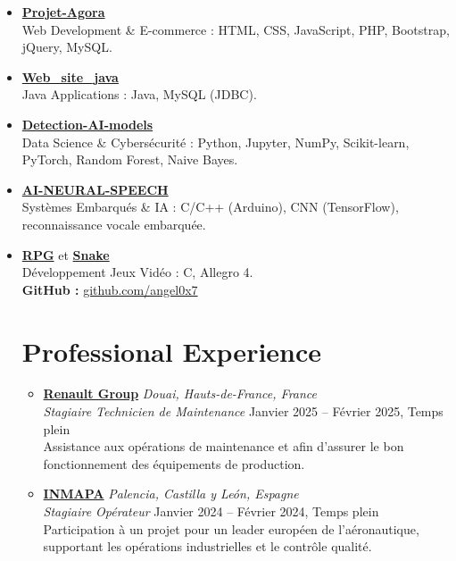 \documentclass[a4paper,10pt]{article}
\begin{document}
\begin{itemize}[leftmargin=*]
  \item \href{https://github.com/angel0x7/Projet-Agora}{\textbf{Projet-Agora}} \\
  Web Development \& E-commerce : HTML, CSS, JavaScript, PHP, Bootstrap, jQuery, MySQL.

  \item \href{https://github.com/angel0x7/Web_site_java}{\textbf{Web\_site\_java}} \\
  Java Applications : Java, MySQL (JDBC).

  \item \href{https://github.com/angel0x7/Detection-AI-models-}{\textbf{Detection-AI-models}} \\
  Data Science \& Cybersécurité : Python, Jupyter, NumPy, Scikit-learn, PyTorch, Random Forest, Naive Bayes.

  \item \href{https://github.com/angel0x7/AI-NEURAL-SPEECH-}{\textbf{AI-NEURAL-SPEECH}} \\
  Systèmes Embarqués \& IA : C/C++ (Arduino), CNN (TensorFlow), reconnaissance vocale embarquée.

  \item \href{https://github.com/angel0x7/Role-playing-video-game}{\textbf{RPG}} et \href{https://github.com/angel0x7/snake_jeu_allegro}{\textbf{Snake}} \\
  Développement Jeux Vidéo : C, Allegro 4.\\

\noindent
\textbf{GitHub :} \href{https://github.com/angel0x7}{github.com/angel0x7}
\section*{Professional Experience}

\begin{itemize}[leftmargin=*]

  \item
  \textbf{\href{https://www.renaultgroup.com/}{Renault Group}} \hfill \emph{Douai, Hauts-de-France, France} \\
  \emph{Stagiaire Technicien de Maintenance} \hfill Janvier 2025 – Février 2025, Temps plein \\
  Assistance aux opérations de maintenance et  afin d'assurer le bon fonctionnement des équipements de production.

\item
  \textbf{\href{https://www.inmapa.com/en/}{INMAPA}} \hfill \emph{Palencia, Castilla y León, Espagne} \\
  \emph{Stagiaire Opérateur} \hfill Janvier 2024 – Février 2024, Temps plein \\
  Participation à un projet pour un leader européen de l’aéronautique, supportant les opérations industrielles et le contrôle qualité.


\end{itemize}
\end{itemize}
\end{document}

